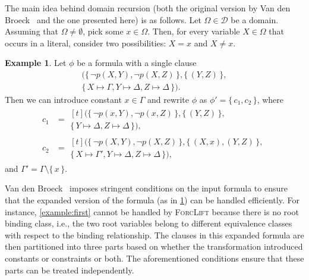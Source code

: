 \documentclass{article}
\theoremstyle{definition}
\newtheorem{example}{Example}
\begin{document}
The main idea behind domain recursion (both the original version by Van den
Broeck~ and the one presented here) is as
follows. Let $\Omega \in \mathcal{D}$ be a domain. Assuming that
$\Omega \ne \emptyset$, pick some $x \in \Omega$. Then, for every variable
$X \in \Omega$ that occurs in a literal, consider two possibilities: $X = x$ and
$X \ne x$.

\begin{example}\label{example:dr}
  Let $\phi$ be a formula with a single clause
  \begin{multline*}
    (\{\, \neg p(X, Y), \neg p(X, Z) \,\}, \{\, (Y, Z) \,\}, \\
    \{\, X \mapsto \Gamma, Y \mapsto \Delta, Z \mapsto \Delta \,\}).
  \end{multline*}
  Then we can introduce constant $x \in \Gamma$ and rewrite $\phi$ as
  $\phi' = \{\, c_{1}, c_{2} \,\}$, where
  \begin{align*}
    c_{1} &= \begin{multlined}[t]
      (\{\, \neg p(x, Y), \neg p(x, Z) \,\}, \{\, (Y, Z) \,\}, \\
      \{\, Y \mapsto \Delta, Z \mapsto \Delta \,\}),
      \end{multlined}\\
    c_{2} &= \begin{multlined}[t]
      (\{\, \neg p(X, Y), \neg p(X, Z) \,\}, \{\, (X, x), (Y, Z) \,\}, \\
      \{\, X \mapsto \Gamma', Y \mapsto \Delta, Z \mapsto \Delta \,\}),
      \end{multlined}
  \end{align*}
  and $\Gamma' = \Gamma \setminus \{\, x \,\}$.
\end{example}

Van den Broeck~ imposes stringent conditions
on the input formula to ensure that the expanded version of the formula (as in
\cref{example:dr}) can be handled efficiently. For instance,
\cref{example:first} cannot be handled by \textsc{ForcLift} because there is no
root binding class, i.e., the two root variables belong to different equivalence
classes with respect to the binding relationship. The clauses in this expanded
formula are then partitioned into three parts based on whether the
transformation introduced constants or constraints or both. The aforementioned
conditions ensure that these parts can be treated independently.
\end{document}
